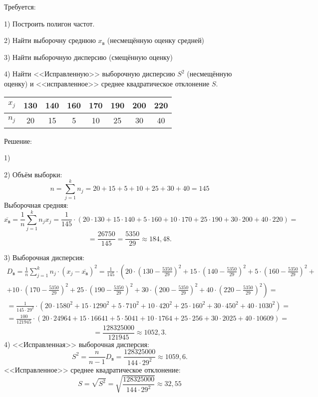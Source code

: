 \documentclass{article}
\begin{document}
\begin{enumerate}
Требуется:

1) Построить полигон частот.

2) Найти выборочну среднюю $x_\textit{в}$ (несмещённую оценку средней)

3) Найти выборочную дисперсию (смещённую оценку)

4) Найти <<Исправленную>> выборочную дисперсию $S^2$ (несмещённую оценку) и <<исправленное>> среднее квадратическое отклонение $S$.

\begin{center}
\begin{tabular}{|c|c|c|c|c|c|c|c|}
\hline
$x_j$ & 130 & 140 & 160 & 170 & 190 & 200 & 220 \\
\hline
$n_j$ & 20 & 15 & 5 & 10 & 25 & 30 & 40 \\
\hline
\end{tabular}
\end{center}
\begin{center}Решение:\end{center}
1)

2)  Объём выборки: $$n=\sum_{j=1}^k n_j=20+15+5+10+25+30+40=145$$
Выборочная средняя:
$$\overline{x_\textit{в}}=\frac{1}{n}\sum_{j=1}^k n_j x_j=\frac{1}{145}\cdot\left(20\cdot130+15\cdot140+5\cdot160+10\cdot170+25\cdot190+30\cdot200+40\cdot220\right)=$$
$$=\frac{26750}{145}=\frac{5350}{29}\approx184,48.$$

3) Выборочная дисперсия:
\begin{multline*}
D_{\textit{в}}=\frac{1}{n}\sum_{j=1}^k n_j
\cdot\left(x_j-\overline{x_\textit{в}}\right)^2=
\frac{1}{145}\cdot\left(20\cdot\left(130-\frac{5350}{29}\right)^2+15\cdot\left(140-\frac{5350}{29}\right)^2+5\cdot\left(160-\frac{5350}{29}\right)^2+\right.\\
+\left.10\cdot\left(170-\frac{5350}{29}\right)^2+25\cdot\left(190-\frac{5350}{29}\right)^2+30\cdot\left(200-\frac{5350}{29}\right)^2+40\cdot\left(220-\frac{5350}{29}\right)^2\right)=\\
=\frac{1}{145\cdot29^2}\cdot\left(20\cdot1580^2+15\cdot1290^2+5\cdot710^2+10\cdot420^2+25\cdot160^2+30\cdot450^2+40\cdot1030^2\right)=\\
=\frac{100}{121945}\cdot\left(20\cdot24964+15\cdot16641+5\cdot5041+10\cdot1764+25\cdot256+30\cdot2025+40\cdot10609\right)=
\end{multline*}
$$=\frac{128325000}{121945}\approx1052,3.$$
4) <<Исправленная>> выборочная дисперсия:
$$S^2=\frac{n}{n-1}D_{\textit{в}}=\frac{128325000}{144\cdot29^2}\approx1059,6.$$
<<Исправленное>> среднее квадратическое отклонение:
$$S=\sqrt{S^2}=\sqrt{\frac{128325000}{144\cdot29^2}}\approx32,55$$


\end{enumerate}
\end{document}
